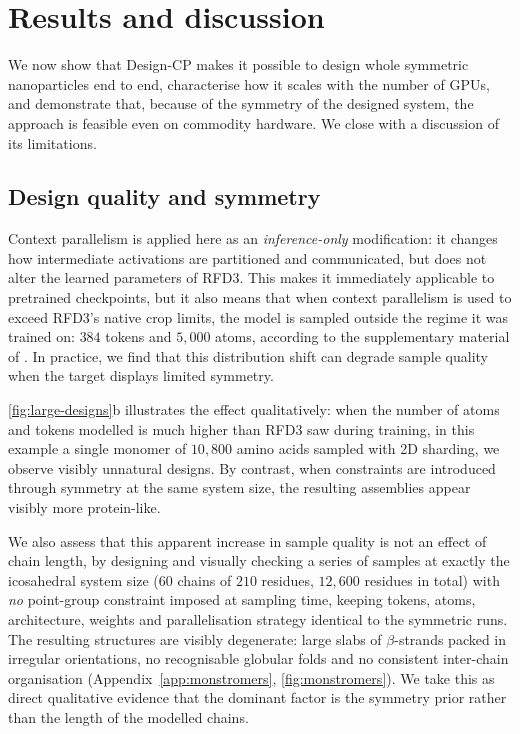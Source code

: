 \chapter{Results and discussion}
\label{ch:results}

We now show that Design-CP makes it possible to design whole symmetric
nanoparticles end to end, characterise how it scales with the number of GPUs, and
demonstrate that, because of the symmetry of the designed system, the approach is feasible even on
commodity hardware. We close with a discussion of its limitations.

\section{Design quality and symmetry}
\label{sec:design-quality}

Context parallelism is applied here as an \emph{inference-only} modification: it
changes how intermediate activations are partitioned and communicated, but does
not alter the learned parameters of RFD3. This makes it immediately applicable to
pretrained checkpoints, but it also means that when context parallelism is used to
exceed RFD3's native crop limits, the model is sampled outside the regime it was
trained on: $384$ tokens and $5{,}000$ atoms, according to the supplementary
material of \textcite{butcher_novo_2025}. In practice, we find that this
distribution shift can degrade sample quality when the target displays limited
symmetry.

\cref{fig:large-designs}b illustrates the effect qualitatively: when the
number of atoms and tokens modelled is much higher than RFD3 saw during training,
in this example a single monomer of $10{,}800$ amino acids sampled with 2D
sharding, we observe visibly unnatural designs. By contrast, when constraints are
introduced through symmetry at the same system size, the resulting assemblies
appear visibly more protein-like.

We also assess that this apparent increase in sample quality is not an effect of chain length, 
by designing and visually checking a series of samples at exactly the icosahedral system size
($60$ chains of $210$ residues, $12{,}600$ residues in total) with \emph{no}
point-group constraint imposed at sampling time, keeping tokens, atoms,
architecture, weights and parallelisation strategy identical to the symmetric
runs. The resulting structures are visibly degenerate: large slabs of
$\beta$-strands packed in irregular orientations, no recognisable globular folds
and no consistent inter-chain organisation (Appendix~\ref{app:monstromers},
\cref{fig:monstromers}). We take this as direct qualitative evidence that
the dominant factor is the symmetry prior rather than the length of the modelled
chains.

